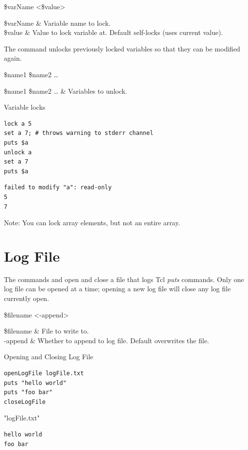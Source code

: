 \documentclass{article}
\renewcommand{\^}[1]{\textsuperscript{#1}}
\renewcommand{\_}[1]{\textsubscript{#1}}
\begin{document}
\begin{syntax}
 \$varName <\$value>
\end{syntax}
\begin{args}
\$varName & Variable name to lock.  \\
\$value & Value to lock variable at. Default self-locks (uses current value).
\end{args}

The command  unlocks previously locked variables so that they can be modified again.
\begin{syntax}
 \$name1 \$name2 …
\end{syntax}
\begin{args}
\$name1 \$name2 … & Variables to unlock.
\end{args}

\begin{example}{Variable locks}
\begin{lstlisting}
lock a 5
set a 7; # throws warning to stderr channel
puts $a
unlock a
set a 7
puts $a
\end{lstlisting}
\tcblower
\begin{lstlisting}
failed to modify "a": read-only
5
7
\end{lstlisting}
\end{example}

Note: You can lock array elements, but not an entire array.
\clearpage
\section{Log File}
The commands  and  open and close a file that logs Tcl \textit{puts} commands. 
Only one log file can be opened at a time; opening a new log file will close any log file currently open.
\begin{syntax}
 \$filename <-append>
\end{syntax}
\begin{syntax}
\end{syntax}
\begin{args}
\$filename & File to write to. \\
-append & Whether to append to log file. Default overwrites the file.
\end{args}

\begin{example}{Opening and Closing Log File}
\begin{lstlisting}
openLogFile logFile.txt
puts "hello world"
puts "foo bar"
closeLogFile
\end{lstlisting}
\tcblower\quad
"logFile.txt"
\begin{lstlisting}
hello world
foo bar
\end{lstlisting}
\end{example}
\clearpage

\printindex
\end{document}
